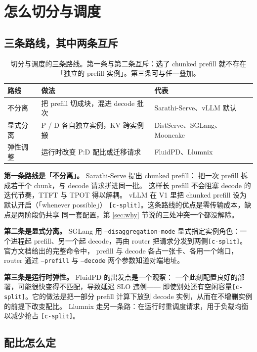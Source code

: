 \section{怎么切分与调度}
\label{sec:split}

\subsection{三条路线，其中两条互斥}

\begin{table}[t]
\centering
\caption{切分与调度的三条路线。第一条与第二条互斥：选了 chunked prefill
就不存在「独立的 prefill 实例」。第三条可与任一叠加。}
\label{tab:routes}
\small
\begin{tabular}{@{}p{1.5cm}p{2.3cm}p{2.4cm}@{}}
\toprule
路线 & 做法 & 代表 \\
\midrule
不分离 & 把 prefill 切成块，混进 decode 批次 & Sarathi-Serve、vLLM 默认 \\
显式分离 & P / D 各自独立实例，KV 跨实例搬 & DistServe、SGLang、Mooncake \\
弹性调整 & 运行时改变 P:D 配比或迁移请求 & FluidPD、Llumnix \\
\bottomrule
\end{tabular}
\end{table}

\textbf{第一条路线是「不分离」。} Sarathi-Serve 提出 chunked prefill：
把一次 prefill 拆成若干个 chunk，与 decode 请求拼进同一批。
这样长 prefill 不会阻塞 decode 的迭代节奏，TTFT 与 TPOT 得以解耦。
vLLM 在 V1 里把 chunked prefill 设为默认开启（「whenever possible」）
\texttt{[c-split]}。这条路线的优点是零传输成本，缺点是两阶段仍共享
同一套配置，第 \ref{sec:why} 节说的三处冲突一个都没解除。

\textbf{第二条是显式分离。} SGLang 用 \texttt{--disaggregation-mode}
显式指定实例角色：一个进程起 prefill、另一个起 decode，再由 router
把请求分发到两侧\texttt{[c-split]}。官方文档给出的完整命令中，
prefill 与 decode 各占一张卡、各用一个端口，router 通过
\texttt{--prefill} 与 \texttt{--decode} 两个参数知道对端地址。

\textbf{第三条是运行时弹性。} FluidPD 的出发点是一个观察：
一个此刻配置良好的部署，可能很快变得不匹配，导致延迟 SLO 违例——
即使别处还有空闲容量\texttt{[c-split]}。它的做法是把一部分 prefill
计算下放到 decode 实例，从而在不增删实例的前提下改变配比。
Llumnix 走另一条路：在运行时重调度请求，用于负载均衡以减少抢占
\texttt{[c-split]}。

\subsection{配比怎么定}

